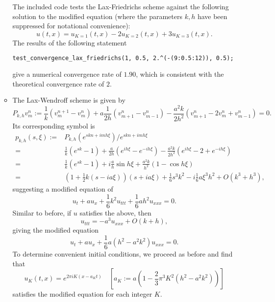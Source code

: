 \documentclass{article}
\begin{document}
\begin{itemize}
\begin{itemize}
The included code tests the Lax-Friedrichs scheme against the following solution to the modified equation (where the parameters $k,h$ have been suppressed for notational convenience):
\begin{equation*}
u(t,x) = u_{K=1}(t,x) - 2 u_{K=2}(t,x) + 3 u_{K=3}(t,x).
\end{equation*}
The results of the following statement
\begin{verbatim}
test_convergence_lax_friedrichs(1, 0.5, 2.^(-(9:0.5:12)), 0.5);
\end{verbatim}
give a numerical convergence rate of $1.90$, which is consistent with the theoretical convergence rate of $2$.

\item The Lax-Wendroff scheme is given by
\begin{equation*}
P_{k,h} v^n_m := \frac{1}{k} \left( v^{n+1}_m - v^n_m \right) + a \frac{1}{2h} \left( v^n_{m+1} - v^n_{m-1} \right) - \frac{a^2k}{2h^2} \left( v^n_{m+1} - 2v^n_m + v^n_{m-1} \right) = 0.
\end{equation*}
Its corresponding symbol is
\begin{align*}
p_{k,h}(s,\xi) := {} & P_{k,h} \left( e^{skn + imh\xi} \right) / e^{skn + imh\xi} \\
                = {} & \frac{1}{k} \left( e^{sk} - 1 \right) + \frac{a}{2h} \left( e^{ih\xi} - e^{-ih\xi} \right) - \frac{a^2k}{2h^2} \left( e^{ih\xi} - 2 + e^{-ih\xi} \right) \\
                = {} & \frac{1}{k} \left( e^{sk} - 1 \right) + i \frac{a}{h} \sin h\xi + \frac{a^2k}{h^2} \left( 1 - \cos h\xi \right) \\
                = {} & \left( 1 + \frac{1}{2} k \left( s - i a \xi \right) \right) \left( s + i a \xi \right) + \frac{1}{6} s^3 k^2 - i \frac{1}{6} a \xi^3 h^2 + O \left( k^3 + h^3 \right),
\end{align*}
suggesting a modified equation of
\begin{equation*}
u_t + a u_x + \frac{1}{6} k^2 u_{ttt} + \frac{1}{6} a h^2 u_{xxx} = 0.
\end{equation*}
Similar to before, if $u$ satisfies the above, then
\begin{equation*}
u_{ttt} = -a^3 u_{xxx} + O \left( k + h \right),
\end{equation*}
giving the modified equation
\begin{equation*}
u_t + a u_x + \frac{1}{6} a \left( h^2 - a^2 k^2 \right) u_{xxx} = 0.
\end{equation*}
To determine convenient initial conditions, we proceed as before and find that
\begin{equation*}
u_K(t,x) = e^{2 \pi i K \left( x - a_K t \right)} \quad \left[ a_K := a \left( 1 - \frac{2}{3} \pi^3 K^2 \left( h^2 - a^2 k^2 \right) \right) \right]
\end{equation*}
satisfies the modified equation for each integer $K$.


\end{itemize}
\end{itemize}
\end{document}
